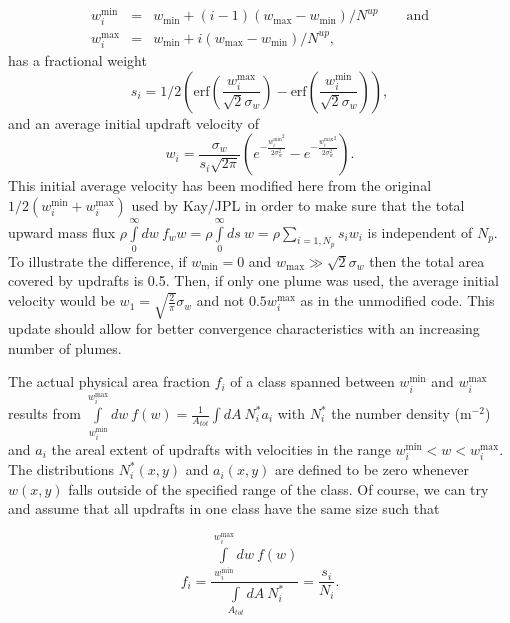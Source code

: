 \documentclass[dvipdfmx,a4paper,10pt]{article}
\begin{document}
\begin{eqnarray}
 w_i^{\mathrm{min}}&=&w_{\mathrm{min}}+(i-1)(w_{\mathrm{max}}-w_{\mathrm{min}})/N^{up} \qquad\mathrm{and}\\
 w_i^{\mathrm{max}}&=&w_{\mathrm{min}}+i(w_{\mathrm{max}}-w_{\mathrm{min}})/N^{up},
\end{eqnarray}
has a fractional weight  
\begin{equation}
 s_i =1/2(\mathrm{erf}(\frac{w_i^{\mathrm{max}}}{\sqrt{2}\sigma_w}) - \mathrm{erf}(\frac{w_i^{\mathrm{min}}}{\sqrt{2}\sigma_w})),
\end{equation}
and an average initial updraft velocity of 
\begin{equation}
 w_i =   \frac{\sigma_w}{s_i \sqrt{2 \pi }} (e^{-\frac{{w_i^{\mathrm{min}}}^2}{2 \sigma_w^2}}- e^{-\frac{{w_i^{\mathrm{max}}}^2}{2 \sigma_w^2}}).
\end{equation}
This initial average velocity has been modified here from the original $1/2(w_i^{\mathrm{min}}+w_i^{\mathrm{max}})$ used by Kay/JPL in order to make sure that the total upward mass flux $\rho \int\limits_0^{\infty} dw~f_w w = \rho \int\limits_0^{\infty} ds~ w=\rho \sum_{i=1,N_p} s_i w_i $ is independent of $N_p$. To illustrate the difference, if $w_{\mathrm{min}}=0$ and $w_{\mathrm{max}}\gg\sqrt{2}\sigma_w$ then the total area covered by updrafts is 0.5. Then, if only one plume was used, the average initial velocity would be $w_1=\sqrt{\frac{2}{\pi}} \sigma_w$ and not $0.5 w_i^{\mathrm{max}}$ as in the unmodified code. This update should allow for better convergence characteristics with an increasing number of plumes. 


The actual physical area fraction $f_i$ of a class spanned between $w_i^{\mathrm{min}}$ and $w_i^{\mathrm{max}}$ results from 
$\int\limits_{w_i^{\mathrm{min}}}^{w_i^{\mathrm{max}}} dw~ f(w) =\frac{1}{A_{tot}}\int\limits dA~N^*_i a_i$ with $N^*_i$ the number density (m$^{-2}$) and $a_i$ the areal extent of updrafts with velocities in the range $w_i^{\mathrm{min}}<w<w_i^{\mathrm{max}}$. The distributions $N^*_i(x,y)$ and $a_i(x,y)$ are defined to be zero whenever $w(x,y)$ falls outside of the specified range of the class. Of course, we can try and assume that all updrafts in one class have the same size such that 

\begin{equation}
 f_i = \frac{\int\limits_{w_i^{\mathrm{min}}}^{w_i^{\mathrm{max}}} dw~ f(w) }{ \int\limits_{A_{tot}} dA~N^*_i}= \frac{s_i }{ N_i}.
\end{equation}
\end{document}

